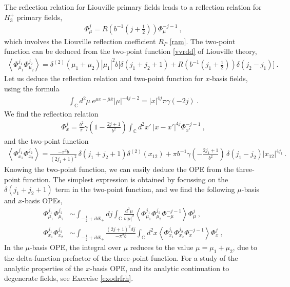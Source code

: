 \documentclass[12pt, a4paper, notitlepage, twoside]{report}
\numberwithin{equation}{section}
\theoremstyle{break}
\begin{document}
The reflection relation for Liouville primary fields leads to a reflection relation for $H_3^+$ primary fields,
\begin{align}
 \Phi^j_{\mu} = R\left(b^{-1}(j+\tfrac12)\right) \Phi^{-j-1}_{\mu} \ ,
\end{align}
which involves the Liouville reflection coefficient $R_P$ \eqref{ram}. The two-point function can be deduced from the two-point function \eqref{vvrdd} of Liouville theory, 
\begin{align}
 \left\langle \Phi^{j_1}_{\mu_1} \Phi^{j_2}_{\mu_2}\right\rangle = \delta^{(2)}(\mu_1+\mu_2) |\mu_1|^2 b\Big[\delta(j_1+j_2+1) + R\left(b^{-1}(j_1+\tfrac12)\right) \delta(j_2-j_1)\Big]\ .
\end{align}
Let us deduce the reflection relation and two-point function for $x$-basis fields, using the formula  
\begin{align}
 \int_{{\mathbb{C}}}d^2\mu\ e^{\mu x-\bar{\mu}\bar{x}} |\mu|^{-4j-2} = |x|^{4j}\pi \gamma(-2j) \ .
\label{icmx}
\end{align}
We find the reflection relation 
\begin{align}
 \Phi^j_{x} = \frac{b^2}{\pi}\gamma\left(1-\tfrac{2j+1}{b^2}\right)\int_{{\mathbb{C}}}d^2x'\ |x-x'|^{4j}\Phi^{-j-1}_{x'}\ ,
\end{align}
and the two-point function 
\begin{align}
 \left\langle \Phi^{j_1}_{x_1} \Phi^{j_2}_{x_2} \right\rangle = \frac{-\pi^2 b}{(2j_1+1)^2}\, \delta(j_1+j_2+1)\delta^{(2)}(x_{12}) 
+ \pi b^{-1} \gamma\left(-\tfrac{2j_1+1}{b^2}\right)\, \delta(j_1-j_2)|x_{12}|^{4j_1}\, .
\label{pjpj}
\end{align}
Knowing the two-point function, we can easily deduce the OPE from the three-point function. 
The simplest expression is obtained by focussing on the $\delta(j_1+j_2+1)$ term in the two-point function, and we find the following $\mu$-basis and $x$-basis OPEs,
\begin{align}
\Phi^{j_1}_{\mu_1}\Phi^{j_2}_{\mu_2} &\sim  \int_{-\frac12 + ib\mathbb{R}_+} dj\int_{{\mathbb{C}}}\frac{d^2\mu}{b|\mu|^2} \left\langle \Phi^{j_1}_{\mu_1}\Phi^{j_2}_{\mu_2} \Phi^{-j-1}_{-\mu} \right\rangle \Phi^j_{\mu}\ , 
\label{mope}
\\
\Phi^{j_1}_{x_1}\Phi^{j_2}_{x_2} &\sim \int_{-\frac12 + ib\mathbb{R}_+} \frac{(2j+1)^2 dj}{-\pi^2b}\int_{{\mathbb{C}}}d^2x \left\langle \Phi^{j_1}_{x_1}\Phi^{j_2}_{x_2} \Phi^{-j-1}_{x} \right\rangle \Phi^j_{x}\ ,
\label{xope}
\end{align}
In the $\mu$-basis OPE, the integral over $\mu$ reduces to the value $\mu=\mu_1+\mu_2$, due to the delta-function prefactor of the three-point function. 
For a study of the analytic properties of the $x$-basis OPE, and its analytic continuation to degenerate fields, see Exercise \ref{exodrfrh}.
\end{document}
